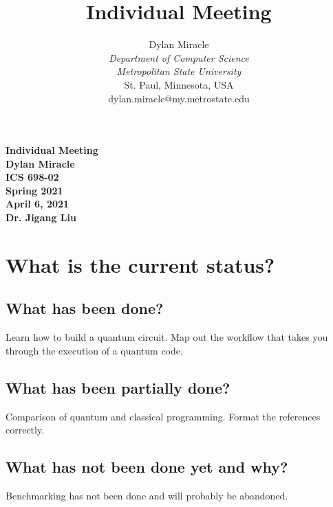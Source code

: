 \documentclass{article}
\begin{document}
\begin{titlepage}
    \begin{center}
        \vspace{4cm}
        \large
        \textbf{
            Individual Meeting \\
            Dylan Miracle \\
            ICS 698-02 \\
            Spring 2021 \\
            April 6, 2021 \\
            Dr. Jigang Liu
        }
    \end{center}
\end{titlepage}
\title{Individual Meeting}

\author{Dylan Miracle\\
\textit{Department of Computer Science} \\
\textit{Metropolitan State University}\\
St. Paul, Minnesota, USA \\
dylan.miracle@my.metrostate.edu
}

\maketitle

\tableofcontents

\section{What is the current status?}
\subsection{What has been done?}
Learn how to build a quantum circuit. Map out the workflow that takes you through the execution of a quantum code.

\subsection{What has been partially done?}
Comparison of quantum and classical programming. Format the references correctly. 

\subsection{What has not been done yet and why?}
Benchmarking has not been done and will probably be abandoned. 
\end{document}
